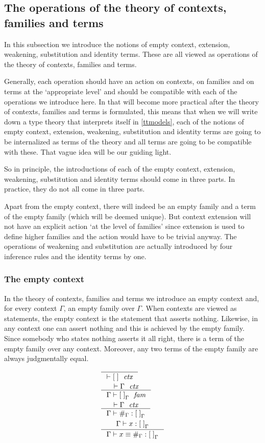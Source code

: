 \subsection{The operations of the theory of contexts, families and terms}
In this subsection we introduce the notions of empty context,
extension, weakening, substitution and identity terms. These are all viewed as
operations of the theory of contexts, families and terms. 

Generally, 
each operation should
have an action on contexts, on families and on terms at the `appropriate level'
and should be compatible with each of the operations we introduce here. In
that will become more practical after the theory of contexts, families and terms
is formulated, this means that when we will write down a type theory that
interprets itself in \autoref{ttmodels}, each of the notions of empty context,
extension, weakening, substitution and identity terms are going to be internalized
as terms of the theory and all terms are going to be compatible with these.
That vague idea will be our guiding light.

So in principle, the introductions of each of the empty context, extension,
weakening, substitution and identity terms should come in three parts. In 
practice, they do not all come in three parts.

Apart from the empty context, there will indeed be an empty family and a term
of the empty family (which will be deemed unique). But context extension will
not have an explicit action `at the level of families' since extension
is used to define higher families and the action would have to be trivial
anyway. The operations of weakening and substitution are actually introduced
by four inference rules and the identity terms by one.

\subsubsection{The empty context}
\label{empty}
In the theory of contexts, families and terms we introduce an empty context and,
for every context $\Gamma$, an empty family over $\Gamma$. 
When contexts are viewed as statements, the empty context is the statement that
asserts nothing. Likewise, in any context one can assert nothing and this is
achieved by the empty family. 
Since somebody who states nothing asserts it all right, there is a term of the empty
family over any context. Moreover, any two terms of the empty family are always
judgmentally equal.
\begin{align}
& \inference
  { }
  { \jctx{\emptyc}
    }
  \\
& \inference
  { \jctx{\Gamma}
    }
  { \jfam{\Gamma}{\emptyf[\Gamma]}
    }
  \\
& \inference
  { \jctx{\Gamma}
    }
  { \jterm{\Gamma}{\emptyf[\Gamma]}{\emptytm[\Gamma]}
    }
  \\
& \inference
  { \jterm{\Gamma}{\emptyf[\Gamma]}{x}
    }
  { \jtermeq
      {\Gamma}
      {\emptyf[\Gamma]}
      {x}
      {\emptytm[\Gamma]}
    }
\end{align}

